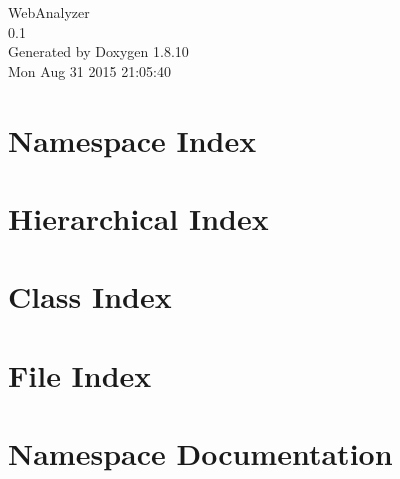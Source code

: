 \documentclass[twoside]{book}
\newcommand{\+}{\discretionary{\mbox{\scriptsize$\hookleftarrow$}}{}{}}
\newcommand{\clearemptydoublepage}{%
  \newpage{\pagestyle{empty}\cleardoublepage}%
}
\begin{document}
\hypersetup{pageanchor=false,
             bookmarks=true,
             bookmarksnumbered=true,
             pdfencoding=unicode
            }
\begin{titlepage}
\vspace*{7cm}
\begin{center}%
{\Large Web\+Analyzer \\[1ex]\large 0.\+1 }\\
\vspace*{1cm}
{\large Generated by Doxygen 1.8.10}\\
\vspace*{0.5cm}
{\small Mon Aug 31 2015 21:05:40}\\
\end{center}
\end{titlepage}
\clearemptydoublepage
\tableofcontents
\clearemptydoublepage
{}
\hypersetup{pageanchor=true}

\chapter{Namespace Index}

\chapter{Hierarchical Index}

\chapter{Class Index}

\chapter{File Index}

\chapter{Namespace Documentation}





















\end{document}
